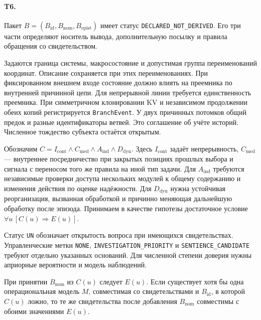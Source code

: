 \paragraph{T6.} Пакет $B=(B_{\mathrm{id}},B_{\mathrm{nom}},B_{\mathrm{epist}})$ имеет статус \texttt{DECLARED\_NOT\_DERIVED}. Его три части определяют носитель вывода, дополнительную посылку и правила обращения со свидетельством.
\begin{description}[leftmargin=1.35cm,style=nextline]
\item[$B_{\mathrm{id}}$] Задаются граница системы, макросостояние и допустимая группа переименований координат. Описание сохраняется при этих переименованиях. При фиксированном внешнем входе состояние должно влиять на преемника по внутренней причинной цепи. Для непрерывной линии требуется единственность преемника. При симметричном клонировании KV и независимом продолжении обеих копий регистрируется \texttt{BranchEvent}. У двух причинных потомков общий предок и разные идентификаторы ветвей. Это соглашение об учёте историй. Численное тождество субъекта остаётся открытым.
\item[$B_{\mathrm{nom}}$] Обозначим $C=I_{\mathrm{cont}}\land C_{\mathrm{med}}\land A_{\mathrm{ind}}\land D_{\mathrm{dyn}}$. Здесь $I_{\mathrm{cont}}$ задаёт непрерывность, $C_{\mathrm{med}}$ --- внутреннее посредничество при закрытых позициях прошлых выбора и сигнала с переносом того же правила на иной тип задачи. Для $A_{\mathrm{ind}}$ требуются независимые проверки доступа нескольких модулей к общему содержанию и изменения действия по оценке надёжности. Для $D_{\mathrm{dyn}}$ нужна устойчивая реорганизация, вызванная обработкой и причинно меняющая дальнейшую обработку после эпизода. Принимаем в качестве гипотезы достаточное условие $\forall u\,[C(u)\Rightarrow E(u)]$.
\item[$B_{\mathrm{epist}}$] Статус \texttt{UN} обозначает открытость вопроса при имеющихся свидетельствах. Управленческие метки \texttt{NONE}, \texttt{INVESTIGATION\_PRIORITY} и \texttt{SENTIENCE\_CANDIDATE} требуют отдельно указанных оснований. Для численной степени доверия нужны априорные вероятности и модель наблюдений.
\end{description}
\begin{theorem}
\label{thm:conditional-bridge}
При принятии $B_{\mathrm{nom}}$ из $C(u)$ следует $E(u)$. Если существует хотя бы одна операциональная модель $M$, совместимая со свидетельствами и $B_{\mathrm{id}}$, в которой $C(u)$ ложно, то те же свидетельства после добавления $B_{\mathrm{nom}}$ совместимы с обоими значениями $E(u)$.
\end{theorem}
